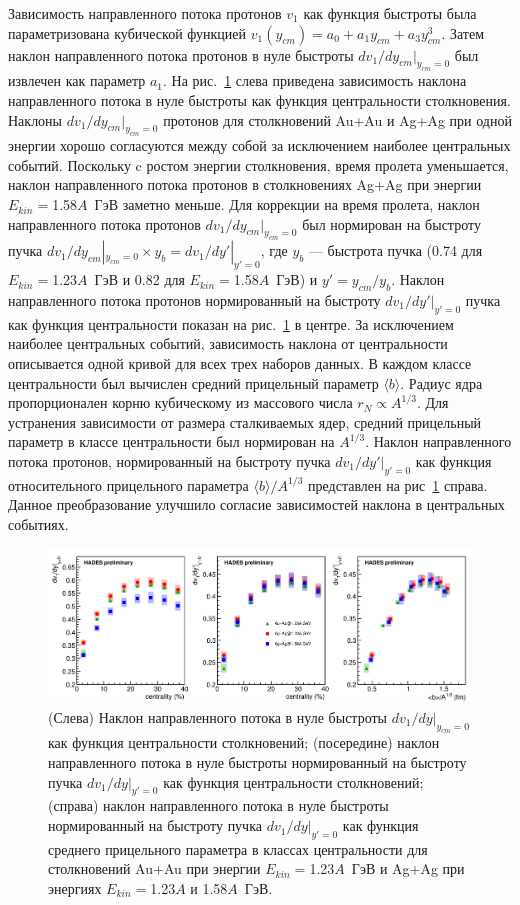 Зависимость направленного потока протонов $v_1$ как функция быстроты была параметризована кубической функцией $v_1(y_{cm}) = a_0 + a_1 y_{cm} + a_3 y_{cm}^3$. 
Затем наклон направленного потока протонов в нуле быстроты $dv_1/dy_{cm}|_{y_{cm}=0}$ был извлечен как параметр $a_1$.
На рис.~\ref{fig:hades_dv1dy_many_plot} слева приведена зависимость наклона направленного потока в нуле быстроты как функция центральности столкновения.
Наклоны $dv_1/dy_{cm}|_{y_{cm}=0}$ протонов для столкновений Au+Au и Ag+Ag при одной энергии хорошо согласуются между собой за исключением наиболее центральных событий. 
Поскольку c ростом энергии столкновения, время пролета уменьшается, наклон направленного потока протонов в столкновениях Ag+Ag при энергии $E_{kin}=$1.58$A$~ГэВ заметно меньше.
Для коррекции на время пролета, наклон направленного потока протонов $dv_1/dy_{cm}|_{y_{cm}=0}$ был нормирован на быстроту пучка $dv_1/dy_{cm}|_{y_{cm}=0} \times y_{b} = dv_1/dy'|_{y'=0}$, где $y_{b}$ --- быстрота пучка (0.74 для $E_{kin}=$1.23$A$~ГэВ и 0.82 для  $E_{kin}=$1.58$A$~ГэВ) и $y'=y_{cm}/y_b$.
Наклон направленного потока протонов нормированный на быстроту $dv_1/dy'|_{y'=0}$ пучка как функция центральности показан на рис.~\ref{fig:hades_dv1dy_many_plot} в центре. 
За исключением наиболее центральных событий, зависимость наклона от центральности описывается одной кривой для всех трех наборов данных.
В каждом классе центральности был вычислен средний прицельный параметр $\langle b \rangle$. 
Радиус ядра пропорционален корню кубическому из массового числа $r_N \propto A^{1/3}$.
Для устранения зависимости от размера сталкиваемых ядер, средний прицельный параметр в классе центральности был нормирован на $A^{1/3}$.
Наклон направленного потока протонов, нормированный на быстроту пучка $dv_1/dy'|_{y'=0}$ как функция относительного прицельного параметра  $ \langle b \rangle / A^{1/3}$ представлен на рис~\ref{fig:hades_dv1dy_many_plot} справа.
Данное преобразование улучшило согласие зависимостей наклона в центральных событиях. 
%
\begin{figure}[ht]
\begin{center}
\includegraphics[width=0.9\linewidth]{images/dv1dy_many_plot.png}
\caption{ 
(Слева) Наклон направленного потока в нуле быстроты $dv_1/dy|_{y_{cm}=0}$ как функция центральности столкновений;
(посередине) наклон направленного потока в нуле быстроты нормированный на быстроту пучка $dv_1/dy|_{y'=0}$ как функция центральности столкновений;
(справа) наклон направленного потока в нуле быстроты нормированный на быстроту пучка $dv_1/dy|_{y'=0}$ как функция среднего прицельного параметра в классах центральности
для столкновений Au+Au при энергии $E_{kin}=$1.23$A$~ГэВ и Ag+Ag при энергиях $E_{kin}=$1.23$A$ и 1.58$A$~ГэВ. }
\label{fig:hades_dv1dy_many_plot}
\end{center}
\end{figure}

